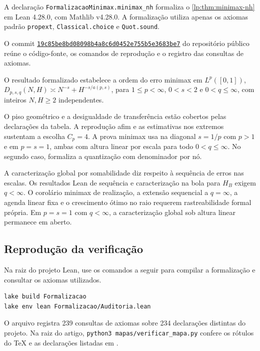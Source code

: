 \documentclass[12pt,a4paper]{article}
\begin{document}
A declaração \texttt{FormalizacaoMinimax.minimax\_nh} formaliza o \cref{lp:thm:minimax-nh} em Lean 4.28.0, com Mathlib v4.28.0. A formalização utiliza apenas os axiomas padrão \texttt{propext}, \texttt{Classical.choice} e \texttt{Quot.sound}.

O commit \href{https://github.com/Walc21/ARTIGO-BESOV/commit/19c85be8bd08098b4a8c6d0452e755b5e3683be7}{\texttt{19c85be8bd08098b4a8c6d0452e755b5e3683be7}} do repositório público reúne o código-fonte, os comandos de reprodução e o registro das consultas de axiomas.

O resultado formalizado estabelece a ordem do erro minimax em $L^p([0,1])$, $D_{p,s,q}(N,H)\asymp N^{-s}+H^{-s/a(p,s)}$, para $1\le p<\infty$, $0<s<2$ e $0<q\le\infty$, com inteiros $N,H\ge2$ independentes.

O piso geométrico e a desigualdade de transferência estão cobertos pelas declarações da tabela. A reprodução afim e as estimativas nos extremos sustentam a escolha $C_p=4$. A prova minimax usa  na diagonal $s=1/p$ com $p>1$ e  em $p=s=1$, ambas com altura linear por escala para todo $0<q\le\infty$. No segundo caso,  formaliza a quantização com denominador por nó.

A caracterização global por somabilidade diz respeito à sequência de erros nas escalas. Os resultados Lean de sequência e caracterização na bola para $H_B$ exigem $q<\infty$. O corolário minimax de realização, a extensão sequencial a $q=\infty$, a agenda linear fixa e o crescimento ótimo no raio requerem rastreabilidade formal própria. Em $p=s=1$ com $q<\infty$, a caracterização global sob altura linear permanece em aberto.

\subsection{Reprodução da verificação}

Na raiz do projeto Lean, use os comandos a seguir para compilar a formalização e consultar os axiomas utilizados.
\begin{verbatim}
lake build Formalizacao
lake env lean Formalizacao/Auditoria.lean
\end{verbatim}
O arquivo  registra 239 consultas de axiomas sobre 234 declarações distintas do projeto. Na raiz do artigo, \texttt{python3 mapas/verificar\_mapa.py} confere os rótulos do TeX e as declarações listadas em .

\ifbesovabnt\else\articlereferences\fi
\end{document}
